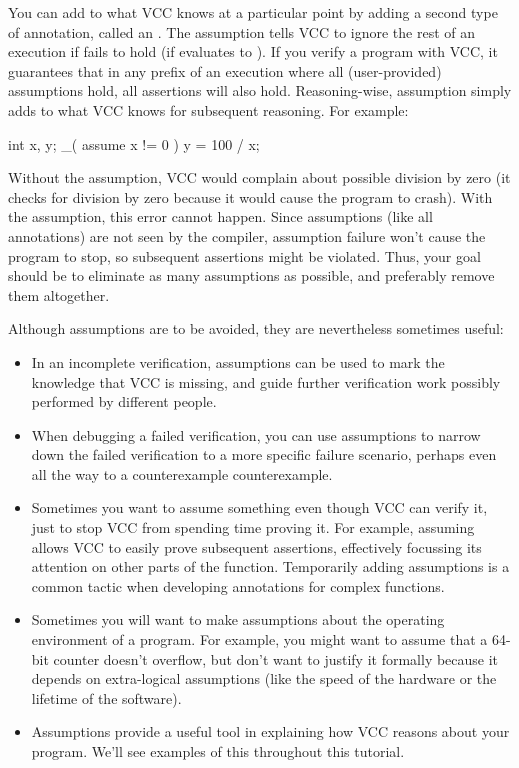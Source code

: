 You can add to what VCC knows at a particular point by adding a second
type of annotation, called an .
The assumption  tells VCC to ignore
the rest of an execution if  fails to hold (\ie if
 evaluates to ). If you verify a
program with VCC, it guarantees that in any prefix of an execution
where all (user-provided) assumptions hold, all assertions will also hold.
Reasoning-wise, assumption simply adds  to what VCC
knows for subsequent reasoning. For example:
\begin{VCC}
int x, y;
_( assume x != 0 )
y = 100 / x;
\end{VCC}
Without the assumption, VCC would complain about possible division by
zero (it checks for division by zero because it would cause the
program to crash).  With the assumption, this error cannot happen.  
Since assumptions (like all annotations) are not seen by the compiler,
assumption failure won't cause the program to stop, so subsequent assertions
might be violated.  
Thus, your goal should be to eliminate as many assumptions as possible, and
preferably remove them altogether.

Although assumptions are to be avoided, they are nevertheless
sometimes useful:
\begin{itemize}
\item In an incomplete verification, assumptions can be used
  to mark the knowledge that VCC is missing, and guide further verification
  work possibly performed by different people.

\item When debugging a failed verification, you can use assumptions to
  narrow down the failed verification to a more specific failure
  scenario, perhaps even all the way to a counterexample counterexample. 

\item Sometimes you want to assume something even though VCC can
  verify it, just to stop VCC from spending time proving it. For
  example, assuming \vcc{\false} allows VCC to 
  easily prove subsequent assertions, effectively focussing its
  attention on other parts of the function. Temporarily adding assumptions
  is a common tactic when developing annotations for complex functions.

\item Sometimes you will want to make assumptions about the operating
  environment of a program. For example, you might want to assume that
  a 64-bit counter doesn't overflow, but don't want to justify it
  formally because it depends on extra-logical assumptions (like the
  speed of the hardware or the lifetime of the software). 
\item Assumptions provide a useful tool in explaining how VCC
  reasons about your program. We'll see examples of this throughout
  this tutorial.
\end{itemize}


